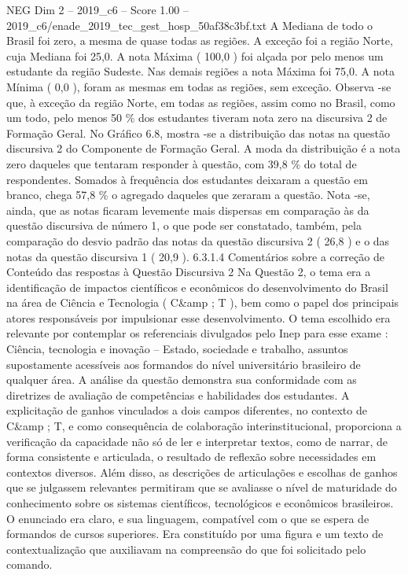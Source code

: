 \begin{textsample}{NEG Dim 2 – 2019\_c6 – Score 1.00 – 2019\_c6/enade\_2019\_tec\_gest\_hosp\_50af38c3bf.txt}
A Mediana de todo o Brasil foi zero, a mesma de quase todas as regiões.
A exceção foi a região Norte, cuja Mediana foi 25,0.
A nota Máxima ( 100,0 ) foi alçada por pelo menos um estudante da região Sudeste.
Nas demais regiões a nota Máxima foi 75,0.
A nota Mínima ( 0,0 ), foram as mesmas em todas as regiões, sem exceção.
Observa -se que, à exceção da região Norte, em todas as regiões, assim como no Brasil, como um todo, pelo menos 50 \% dos estudantes tiveram nota zero na discursiva 2 de Formação Geral.
No Gráfico 6.8, mostra -se a distribuição das notas na questão discursiva 2 do Componente de Formação Geral.
A moda da distribuição é a nota zero daqueles que tentaram responder à questão, com 39,8 \% do total de respondentes.
Somados à frequência dos estudantes deixaram a questão em branco, chega 57,8 \% o agregado daqueles que zeraram a questão.
Nota -se, ainda, que as notas ficaram levemente mais dispersas em comparação às da questão discursiva de número 1, o que pode ser constatado, também, pela comparação do desvio padrão das notas da questão discursiva 2 ( 26,8 ) e o das notas da questão discursiva 1 ( 20,9 ). 6.3.1.4 Comentários sobre a correção de Conteúdo das respostas à Questão Discursiva 2 Na Questão 2, o tema era a identificação de impactos científicos e econômicos do desenvolvimento do Brasil na área de Ciência e Tecnologia ( C\&amp ; T ), bem como o papel dos principais atores responsáveis por impulsionar esse desenvolvimento.
O tema escolhido era relevante por contemplar os referenciais divulgados pelo Inep para esse exame : Ciência, tecnologia e inovação – Estado, sociedade e trabalho, assuntos supostamente acessíveis aos formandos do nível universitário brasileiro de qualquer área.
A análise da questão demonstra sua conformidade com as diretrizes de avaliação de competências e habilidades dos estudantes.
A explicitação de ganhos vinculados a dois campos diferentes, no contexto de C\&amp ; T, e como consequência de colaboração interinstitucional, proporciona a verificação da capacidade não só de ler e interpretar textos, como de narrar, de forma consistente e articulada, o resultado de reflexão sobre necessidades em contextos diversos.
Além disso, as descrições de articulações e escolhas de ganhos que se julgassem relevantes permitiram que se avaliasse o nível de maturidade do conhecimento sobre os sistemas científicos, tecnológicos e econômicos brasileiros.
O enunciado era claro, e sua linguagem, compatível com o que se espera de formandos de cursos superiores.
Era constituído por uma figura e um texto de contextualização que auxiliavam na compreensão do que foi solicitado pelo comando.

\end{textsample}
